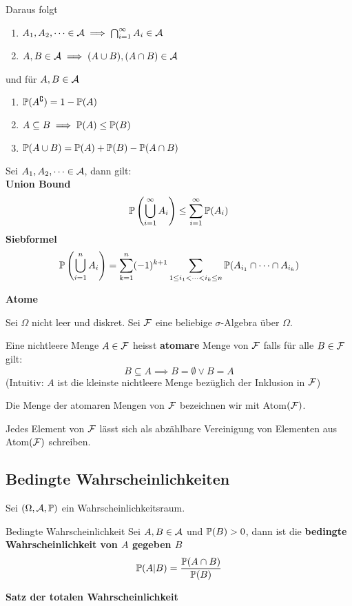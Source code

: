 Daraus folgt
\begin{enumerate}[label=\arabic*.]
    \item $A_1,A_2, \dots \in \A \implies \bigcap_{i=1}^{\infty}A_i \in \A$
    \item $A,B \in \A \implies (A \cup B), (A \cap B) \in \A$
\end{enumerate}
und für $A, B \in \A$
\begin{enumerate}[label=\arabic*.]
    \item $\P(A^\complement) = 1 - \P(A)$
    \item $A \subseteq B \implies \P(A) \leq \P(B)$
    \item $\P(A \cup B) = \P(A)+\P(B)-\P(A \cap B)$
\end{enumerate}
Sei $A_1,A_2, \dots \in \A$, dann gilt:\\
\textbf{Union Bound}
    $$\P\left(\bigcup_{i=1}^{\infty} A_i \right) \leq \sum_{i=1}^{\infty}\P(A_i)$$
\textbf{Siebformel}
    $$\P\left(\bigcup_{i=1}^{n}A_i\right) = \sum_{k = 1}^{n}(-1)^{k+1}\sum_{1\leq i_1 < \dots < i_k \leq n} \P(A_{i_1} \cap \dots \cap A_{i_k})$$

    \textbf{Atome}

        Sei $\Omega$ nicht leer und diskret. Sei $\F$ eine beliebige $\sigma$-Algebra über $\Omega$. 
    
        Eine nichtleere Menge $A \in \F$ heisst \textbf{atomare} Menge von $\F$ falls für alle $B \in \F$ gilt:
        $$B \subseteq A \implies B = \emptyset \lor B = A$$
        (Intuitiv: $A$ ist die kleinste nichtleere Menge bezüglich der Inklusion in $\F$)
    
        Die Menge der atomaren Mengen von $\F$ bezeichnen wir mit Atom$(\F)$.
    
        Jedes Element von $\F$ lässt sich als abzählbare Vereinigung von Elementen aus Atom$(\F)$ schreiben.
    
\subsection{Bedingte Wahrscheinlichkeiten}
 Sei $(\Omega, \A, \P)$ ein Wahrscheinlichkeitsraum.
 \begin{mainbox}{Bedingte Wahrscheinlichkeit}
    Sei $A, B \in \A$ und $\P(B) > 0$, dann ist die \textbf{bedingte Wahrscheinlichkeit von $A$ gegeben $B$}
    $$\P(A|B) = \frac{\P(A \cap B)}{\P(B)}$$
 \end{mainbox}
\textbf{Satz der totalen Wahrscheinlichkeit}

